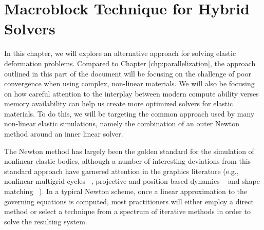 \chapter{Macroblock Technique for Hybrid Solvers}
\label{chp:macroblocks}

In this chapter, we will explore an alternative approach for solving
elastic deformation problems. Compared to Chapter
\ref{chp:parallelization}, the approach outlined in this part of the
document will be focusing on the challenge of poor convergence when
using complex, non-linear materials. We will also be focusing on how
careful attention to the interplay between modern compute ability
verses memory availability can help us create more optimized solvers
for elastic materials. To do this, we will be targeting the common
approach used by many non-linear elastic simulations, namely the
combination of an outer Newton method around an inner linear solver.

The Newton method has largely been the golden standard for the
simulation of nonlinear elastic bodies, although a number of
interesting deviations from this standard approach have garnered
attention in the graphics literature (e.g., nonlinear multigrid cycles
~\citep{ZhuSTB:2010}, projective and position-based dynamics
~\citep{MuellHHR:2007,BouazMLKP:2014,Wang:2015} and shape matching
~\citep{RiverJ:2007}). In a typical Newton scheme, once a linear
approximation to the governing equations is computed, most
practitioners will either employ a direct method or select a technique
from a spectrum of iterative methods in order to solve the resulting
system.


